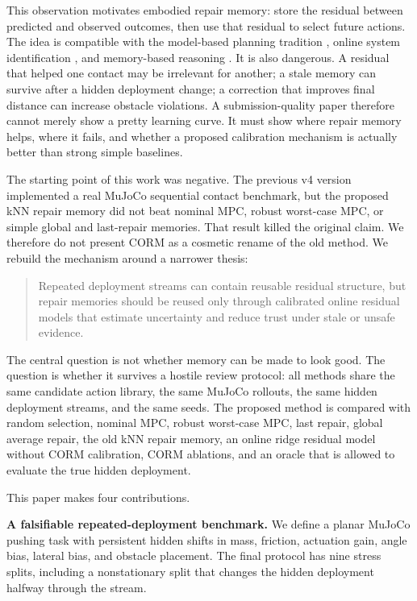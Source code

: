 \documentclass{article}
\begin{document}
This observation motivates embodied repair memory: store the residual between predicted and observed outcomes, then use that residual to select future actions. The idea is compatible with the model-based planning tradition \citep{mayne2000mpc,williams2017mppi,chua2018pets}, online system identification \citep{ljung1999system,anderson1979optimal}, and memory-based reasoning \citep{aamodt1994case}. It is also dangerous. A residual that helped one contact may be irrelevant for another; a stale memory can survive after a hidden deployment change; a correction that improves final distance can increase obstacle violations. A submission-quality paper therefore cannot merely show a pretty learning curve. It must show where repair memory helps, where it fails, and whether a proposed calibration mechanism is actually better than strong simple baselines.

The starting point of this work was negative. The previous v4 version implemented a real MuJoCo sequential contact benchmark, but the proposed kNN repair memory did not beat nominal MPC, robust worst-case MPC, or simple global and last-repair memories. That result killed the original claim. We therefore do not present CORM as a cosmetic rename of the old method. We rebuild the mechanism around a narrower thesis:

\begin{quote}
Repeated deployment streams can contain reusable residual structure, but repair memories should be reused only through calibrated online residual models that estimate uncertainty and reduce trust under stale or unsafe evidence.
\end{quote}

The central question is not whether memory can be made to look good. The question is whether it survives a hostile review protocol: all methods share the same candidate action library, the same MuJoCo rollouts, the same hidden deployment streams, and the same seeds. The proposed method is compared with random selection, nominal MPC, robust worst-case MPC, last repair, global average repair, the old kNN repair memory, an online ridge residual model without CORM calibration, CORM ablations, and an oracle that is allowed to evaluate the true hidden deployment.

This paper makes four contributions.

\textbf{A falsifiable repeated-deployment benchmark.} We define a planar MuJoCo pushing task with persistent hidden shifts in mass, friction, actuation gain, angle bias, lateral bias, and obstacle placement. The final protocol has nine stress splits, including a nonstationary split that changes the hidden deployment halfway through the stream.
\end{document}
